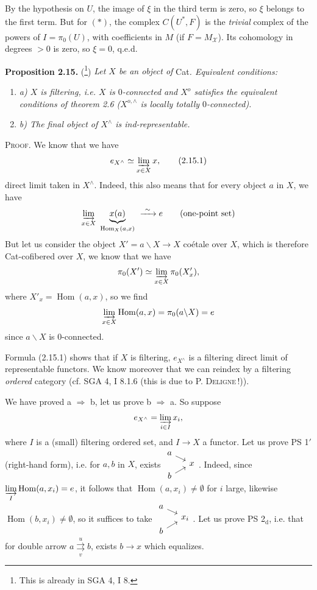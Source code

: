 \documentclass[11pt]{article}
\newcommand{\printedpage}[1]{\marginpar{\footnotesize p.~#1}}
\newcommand{\msp}[1]{\marginpar{\footnotesize [#1]}}
\newcommand{\Hom}{\operatorname{Hom}}
\begin{document}
\printedpage{20}

By the hypothesis on $U$, the image of $\xi$ in the third term is zero, so $\xi$ belongs to the first term. But for $(*)$, the complex $C(U^*,F)$ is the \textit{trivial} complex of the powers of $I=\pi_0(U)$, with coefficients in $M$ (if $F=M_{\mathcal{X}}$). Its cohomology \msp{page 32} in degrees $>0$ is zero, so $\xi=0$, q.e.d.

\noindent\textbf{Proposition 2.15.} (\footnote[39]{This is already in SGA 4, I 8.}) \textit{Let $X$ be an object of} Cat\textit{. Equivalent conditions:}
\begin{enumerate}[label={}, leftmargin=2em, itemsep=0pt]
\item \textit{a) $X$ is filtering, i.e. $X$ is $0$-connected and $X^o$ satisfies the equivalent conditions of theorem 2.6 ($X^{o,\wedge}$ is locally totally $0$-connected).}
\item \textit{b) The final object of $X^\wedge$ is ind-representable.}
\end{enumerate}
\noindent\textsc{Proof}. We know that we have
\[
e_{X^\wedge} \simeq \varinjlim_{x \in X} x, \tag*{(2.15.1)}
\]
direct limit taken in $X^\wedge$. Indeed, this also means that for every object $a$ in $X$, we have
\[
\varinjlim_{x \in X} \ \underbrace{x(a)}_{\Hom_X(a,x)} \ \xrightarrow{\ \sim\ } e \qquad \text{(one-point set)}
\]
But let us consider the object $X' = a\backslash X \longrightarrow X$ coétale over $X$, which is therefore Cat-cofibered over $X$, we know that we have
\[
\pi_0(X') \simeq \varinjlim_{x \in X} \pi_0(X'_x),
\]
where $X'_x = \Hom(a,x)$, so we find
\[
\varinjlim_{x \in X} \Hom(a,x) = \pi_0(a\backslash X) = e
\]
since $a\backslash X$ is 0-connected.

Formula (2.15.1) shows that if \msp{page 33} $X$ is filtering, $e_{X^\wedge}$ is a filtering direct limit of representable functors. We know moreover that we can reindex by a filtering \textit{ordered} category (cf. SGA 4, I 8.1.6 (this is due to P. \textsc{Deligne}\,!)).

We have proved a $\Longrightarrow$ b, let us prove b $\Longrightarrow$ a. So suppose
\[
e_{X^\wedge} = \varinjlim_{i \in I} x_i,
\]
where $I$ is a (small) filtering ordered set, and $I \longrightarrow X$ a functor. Let us prove PS 1$'$ (right-hand form), i.e. for $a, b$ in $X$, exists $\vcenter{\hbox{\begin{tikzcd}[row sep=0.1em, column sep=1.2em]
a \arrow[dr] & \\
& x \\
b \arrow[ur] &
\end{tikzcd}}}$. Indeed, since $\varinjlim\limits_{I} \Hom(a,x_i) = e$, it follows that $\Hom(a,x_i) \neq \emptyset$ for $i$ large, likewise $\Hom(b,x_i) \neq \emptyset$, so it suffices to take $\vcenter{\hbox{\begin{tikzcd}[row sep=0.1em, column sep=1.2em]
a \arrow[dr] & \\
& x_i \\
b \arrow[ur] &
\end{tikzcd}}}$. Let us prove PS 2$_{\mathrm{d}}$, i.e. that for double arrow $a \overset{u}{\underset{v}{\rightrightarrows}} b$, exists $b \longrightarrow x$ which equalizes.
\end{document}
